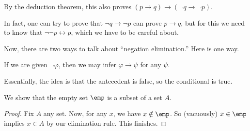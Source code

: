 \begin{remark}
	By the deduction theorem, this also proves $(p\to q)\to(\lnot q\to\lnot p)$.
\end{remark}
In fact, one can try to prove that $\lnot q\to\lnot p$ can prove $p\to q$, but for this we need to know that $\lnot\lnot p\leftrightarrow p$, which we have to be careful about.

Now, there are two ways to talk about ``negation elimination.'' Here is one way.
\begin{defihelper} 
	If we are given $\lnot\varphi$, then we may infer $\varphi\to\psi$ for any $\psi$.
\end{defihelper}
Essentially, the idea is that the antecedent is false, so the conditional is true.
\begin{proposition}
	We show that the empty set $\emp$ is a subset of a set $A$.
\end{proposition}
\begin{proof}
	Fix $A$ any set. Now, for any $x$, we have $x\notin\emp$. So (vacuously) $x\in\emp$ implies $x\in A$ by our elimination rule. This finishes.
\end{proof}